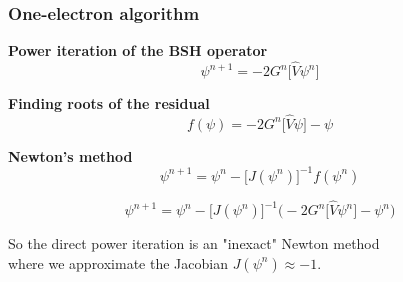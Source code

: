 \begin{frame}
    \frametitle{One-electron algorithm}
    \centering
    \textbf{Power iteration of the BSH operator}
    \begin{equation}
	\nonumber
	\psi^{n+1} = -2G^n\Big[\hat{V} \psi^n\Big]
    \end{equation}

    \vspace{3mm}

    \textbf{Finding roots of the residual}
    \begin{equation}
	\nonumber
	f(\psi) = -2G^n\big[\hat{V} \psi\big] -\psi
    \end{equation}

    \vspace{3mm}

    \textbf{Newton's method}
    \begin{equation}
	\nonumber
	\psi^{n+1} = \psi^n - \Big[J(\psi^n)\Big]^{-1} f(\psi^n)
    \end{equation}

    \begin{equation}
	\nonumber
	\psi^{n+1} = \psi^n - \Big[J(\psi^n)\Big]^{-1}
	\bigg(-2G^n\Big[\hat{V}\psi^n\Big] - \psi^n\bigg)
    \end{equation}

    \vspace{3mm}

    So the direct power iteration is an "inexact" Newton method\\
    where we approximate the Jacobian $J(\psi^n) \approx -1$.
\end{frame}

